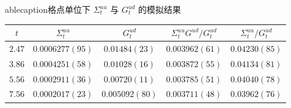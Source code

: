 \topinsert
	ablecaption{格点单位下 $\Sigma^{uu}_t$ 与 $G^{ud}_t$ 的模拟结果}
\begin{center}
\renewcommand{\arraystretch}{1.25}
\begin{tabular}{ccccc}
\hline\hline
$t$ & $\Sigma^{uu}_t$ & $G^{ud}_t$
    & $\Sigma^{uu}_tG^{ud}/G^{ud}_t$ & $\Sigma^{uu}_t/G^{ud}_t$ \\
\hline
$2.47$ & $0.0006277(95)$ & $0.01484(23)$  & $0.003962(61)$ & $0.04230(85)$ \\
$3.86$ & $0.0004251(58)$ & $0.01028(16)$  & $0.003872(55)$ & $0.04134(81)$ \\
$5.56$ & $0.0002911(36)$ & $0.00720(11)$  & $0.003785(51)$ & $0.04040(78)$ \\
$7.56$ & $0.0002017(23)$ & $0.005092(80)$ & $0.003711(48)$ & $0.03962(76)$ \\
\hline\hline
\end{tabular}
\end{center}
\endinsert
